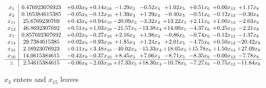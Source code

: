 \documentclass[9pt]{article}
\begin{document}
 \[\begin{array}{c| c c@{\hskip 2pt} c@{\hskip 2pt} c@{\hskip 2pt} c@{\hskip 2pt} c@{\hskip 2pt} c@{\hskip 2pt} c@{\hskip 2pt} c@{\hskip 2pt} }
 x_{1}   &  0.476923076923 & +  0.03 x_{9} & +  0.14 x_{10} & -1.29 x_{3} & -0.52 x_{4} & +  1.02 x_{5} & +  0.51 x_{6} & +  0.00 x_{13} & +  1.17 x_{8}\\
 x_{2}   &  0.165384615385 & -0.05 x_{9} & -0.12 x_{10} & +  1.39 x_{3} & +  1.29 x_{4} & -0.40 x_{5} & -0.51 x_{6} & -0.12 x_{13} & -0.30 x_{8}\\
 x_{11}   &  25.6769230769 & +  0.43 x_{9} & +  0.94 x_{10} & -20.09 x_{3} & -3.32 x_{4} & + 13.22 x_{5} & +  2.11 x_{6} & +  1.00 x_{13} & -2.63 x_{8}\\
 x_{12}   &  46.8692307692 & +  0.51 x_{9} & +  1.03 x_{10} & -21.57 x_{3} & -13.38 x_{4} & + 14.00 x_{5} & -4.37 x_{6} & +  0.25 x_{13} & -2.21 x_{8}\\
 x_{7}   &  0.857692307692 & +  0.02 x_{9} & -0.27 x_{10} & +  2.16 x_{3} & +  1.98 x_{4} & -0.86 x_{5} & -0.74 x_{6} & -0.12 x_{13} & -1.37 x_{8}\\
 x_{14}   &  29.7384615385 & +  0.02 x_{9} & -0.93 x_{10} & +  1.85 x_{3} & +  1.24 x_{4} & +  2.01 x_{5} & -4.75 x_{6} & +  0.50 x_{13} & -20.42 x_{8}\\
 x_{15}   &  2.16923076923 & +  0.11 x_{9} & +  3.48 x_{10} & -40.02 x_{3} & -15.33 x_{4} & + 18.05 x_{5} & + 15.78 x_{6} & +  1.50 x_{13} & + 27.09 x_{8}\\
 x_{16}   &  14.0615384615 & -0.42 x_{9} & -0.37 x_{10} & +  8.45 x_{3} & +  7.06 x_{4} & -8.71 x_{5} & -8.35 x_{6} & -0.00 x_{13} & -7.78 x_{8}\\
\hline
z    &  2.54615384615 & -0.06 x_{9} & -2.03 x_{10} & + 17.33 x_{3} & + 18.30 x_{4} & -10.78 x_{5} & -7.27 x_{6} & -0.75 x_{13} & -11.84 x_{8}\\
\end{array}\]


 $ x_{3} $ enters and $ x_{15} $ leaves 
\end{document}

